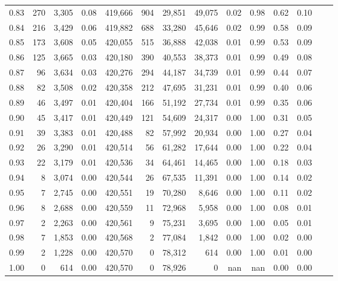 \begin{tabular}{rrrrrrrrrrrrrr}
0.83 &    270 &  3,305 &     0.08 &  419,666 &      904 &  29,851 &  49,075 &  0.02 &  0.98 &  0.62 &      0.10 \\
0.84 &    216 &  3,429 &     0.06 &  419,882 &      688 &  33,280 &  45,646 &  0.02 &  0.99 &  0.58 &      0.09 \\
0.85 &    173 &  3,608 &     0.05 &  420,055 &      515 &  36,888 &  42,038 &  0.01 &  0.99 &  0.53 &      0.09 \\
0.86 &    125 &  3,665 &     0.03 &  420,180 &      390 &  40,553 &  38,373 &  0.01 &  0.99 &  0.49 &      0.08 \\
0.87 &     96 &  3,634 &     0.03 &  420,276 &      294 &  44,187 &  34,739 &  0.01 &  0.99 &  0.44 &      0.07 \\
0.88 &     82 &  3,508 &     0.02 &  420,358 &      212 &  47,695 &  31,231 &  0.01 &  0.99 &  0.40 &      0.06 \\
0.89 &     46 &  3,497 &     0.01 &  420,404 &      166 &  51,192 &  27,734 &  0.01 &  0.99 &  0.35 &      0.06 \\
0.90 &     45 &  3,417 &     0.01 &  420,449 &      121 &  54,609 &  24,317 &  0.00 &  1.00 &  0.31 &      0.05 \\
0.91 &     39 &  3,383 &     0.01 &  420,488 &       82 &  57,992 &  20,934 &  0.00 &  1.00 &  0.27 &      0.04 \\
0.92 &     26 &  3,290 &     0.01 &  420,514 &       56 &  61,282 &  17,644 &  0.00 &  1.00 &  0.22 &      0.04 \\
0.93 &     22 &  3,179 &     0.01 &  420,536 &       34 &  64,461 &  14,465 &  0.00 &  1.00 &  0.18 &      0.03 \\
0.94 &      8 &  3,074 &     0.00 &  420,544 &       26 &  67,535 &  11,391 &  0.00 &  1.00 &  0.14 &      0.02 \\
0.95 &      7 &  2,745 &     0.00 &  420,551 &       19 &  70,280 &   8,646 &  0.00 &  1.00 &  0.11 &      0.02 \\
0.96 &      8 &  2,688 &     0.00 &  420,559 &       11 &  72,968 &   5,958 &  0.00 &  1.00 &  0.08 &      0.01 \\
0.97 &      2 &  2,263 &     0.00 &  420,561 &        9 &  75,231 &   3,695 &  0.00 &  1.00 &  0.05 &      0.01 \\
0.98 &      7 &  1,853 &     0.00 &  420,568 &        2 &  77,084 &   1,842 &  0.00 &  1.00 &  0.02 &      0.00 \\
0.99 &      2 &  1,228 &     0.00 &  420,570 &        0 &  78,312 &     614 &  0.00 &  1.00 &  0.01 &      0.00 \\
1.00 &      0 &    614 &     0.00 &  420,570 &        0 &  78,926 &       0 &   nan &   nan &  0.00 &      0.00 \\
\bottomrule
\end{tabular}
